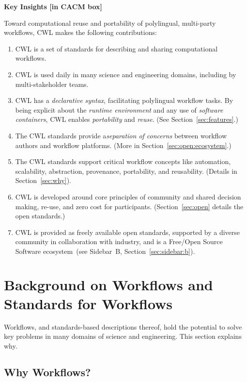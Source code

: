 \documentclass[sigconf,revew,screen,timestamp,nonacm]{acmart}
\begin{document}
\textbf{Key Insights [in CACM box]}

Toward computational reuse and portability of polylingual, multi-party workflows, CWL makes the following contributions:

\begin{enumerate}
\item
  {CWL is a set of standards for describing and sharing computational workflows.}
\item
  {CWL is used daily in many science and engineering domains, including by multi-stakeholder teams.}
\item
  {CWL has a \textit{declarative syntax}, facilitating polylingual workflow tasks. By being explicit about the \textit{runtime environment} and any use of \textit{software containers}, CWL enables \textit{portability} and \textit{reuse}. (See Section~\ref{sec:features}.)}
\item
  {The CWL standards provide a\textit{separation of concerns} between workflow authors and workflow platforms. (More in Section~\ref{sec:open:ecosystem}.)}
\item
  {The CWL standards support critical workflow concepts like automation, scalability, abstraction, provenance, portability, and reusability. (Details in Section~\ref{sec:why}).}
\item
  {CWL is developed around core principles of community and shared decision making, re-use, and zero cost for participants. (Section~\ref{sec:open} details the open standards.)}
\item
  {CWL is provided as freely available open standards, supported by a diverse community in collaboration with industry, and is a Free/Open Source Software ecosystem~(see Sidebar~B, Section~\ref{sec:sidebar:b}).}
\end{enumerate}

\section{Background on Workflows and Standards for Workflows}\label{sec:bg}\label{sec:why}

Workflows, and standards-based descriptions thereof, hold the potential to solve key problems in many domains of science and engineering. This section explains why.

\subsection{Why Workflows?}\label{sec:bg:workflows}
\end{document}
